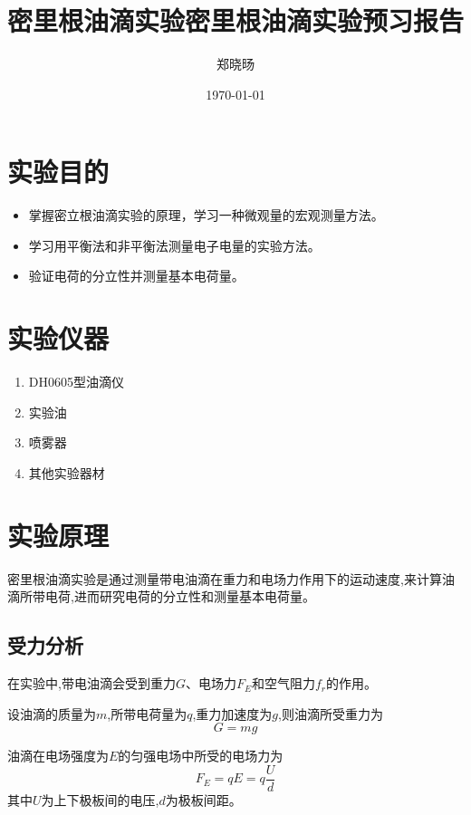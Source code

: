 \documentclass[UTF8]{ctexart}
\title{密里根油滴实验}
\title{密里根油滴实验预习报告}
\author{郑晓旸}
\date{\today}
\begin{document}
\fancyfoot[C]{\thepage}

\maketitle
\tableofcontents
\newpage

\section{实验目的}
\begin{itemize}
    \item 掌握密立根油滴实验的原理，学习一种微观量的宏观测量方法。
    \item 学习用平衡法和非平衡法测量电子电量的实验方法。
    \item 验证电荷的分立性并测量基本电荷量。
\end{itemize}

\section{实验仪器}
\begin{enumerate}
    \item DH0605型油滴仪
    \item 实验油
    \item 喷雾器
    \item 其他实验器材
\end{enumerate}


\section{实验原理}

密里根油滴实验是通过测量带电油滴在重力和电场力作用下的运动速度,来计算油滴所带电荷,进而研究电荷的分立性和测量基本电荷量。

\subsection{受力分析}
在实验中,带电油滴会受到重力$G$、电场力$F_E$和空气阻力$f_r$的作用。

设油滴的质量为$m$,所带电荷量为$q$,重力加速度为$g$,则油滴所受重力为
\begin{equation}
    G = mg
\end{equation}

油滴在电场强度为$E$的匀强电场中所受的电场力为
\begin{equation}
    F_E = qE = q\frac{U}{d}
\end{equation}
其中$U$为上下极板间的电压,$d$为极板间距。
\end{document}
